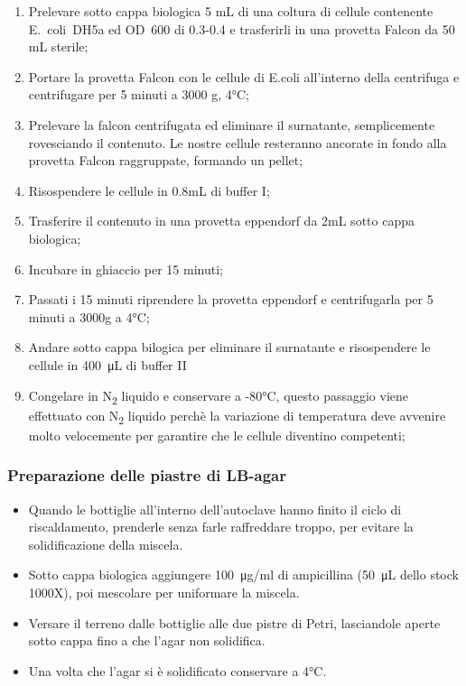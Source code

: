 \begin{enumerate}

	\item Prelevare sotto cappa biologica 5 mL di una coltura di cellule
  contenente E.~coli~DH5a ed OD~600 di 0.3-0.4 e trasferirli in
  una provetta Falcon da 50 mL sterile;

  \item Portare la provetta Falcon con le cellule di E.coli all'interno della centrifuga
  e centrifugare per 5 minuti a 3000 g, 4°C;

  \item Prelevare la falcon centrifugata ed eliminare il surnatante, semplicemente
  rovesciando il contenuto. Le nostre cellule resteranno ancorate in fondo alla provetta
  Falcon raggruppate, formando un pellet;

  \item Risospendere le cellule in 0.8mL di buffer I;

  \item Trasferire il contenuto in una provetta eppendorf da 2mL sotto cappa biologica;

  \item Incubare in ghiaccio per 15 minuti;

  \item Passati i 15 minuti riprendere la provetta eppendorf e centrifugarla per 5 minuti a 3000g a 4°C;

  \item Andare sotto cappa bilogica per eliminare il surnatante e risospendere
  le cellule in \SI{400}{\micro\liter} di buffer II

  \item Congelare in N\textsubscript2 liquido e conservare a -80°C,
  questo passaggio viene effettuato con N\textsubscript2 liquido perchè
  la variazione di temperatura deve avvenire molto velocemente per garantire
  che le cellule diventino competenti;

\end{enumerate}

\subsubsection{Preparazione delle piastre di LB-agar}

\begin{itemize}
  \item Quando le bottiglie all'interno dell'autoclave hanno finito il ciclo di riscaldamento,
  prenderle senza farle raffreddare troppo, per evitare la solidificazione della miscela.
  \item Sotto cappa biologica aggiungere \SI{100}{\micro\gram}/ml di ampicillina
  (\SI{50}{\micro\liter} dello stock 1000X), poi mescolare per uniformare la miscela.
  \item Versare il terreno dalle bottiglie alle due pistre di Petri,
  lasciandole aperte sotto cappa fino a che l'agar non solidifica.
  \item Una volta che l'agar si è solidificato conservare a 4°C.
\end{itemize}


